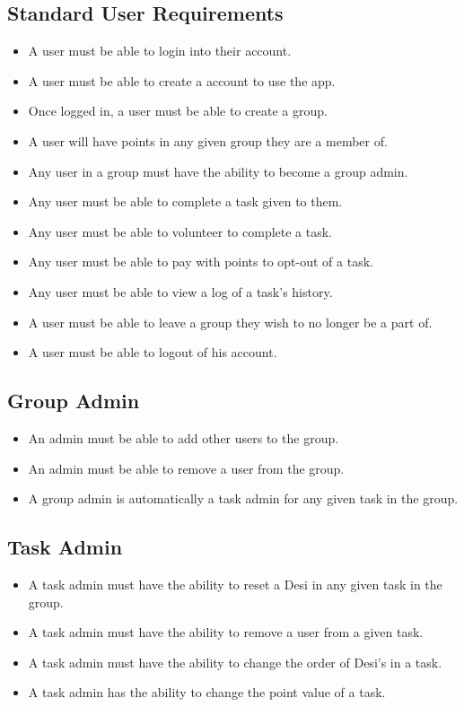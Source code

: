 \documentclass[11pt, a4paper]{report}
\begin{document}
\subsection{Standard User Requirements}
\begin{itemize} 
\item A user must be able to login into their account.
\item A user must be able to create a account to use the app.
\item Once logged in, a user must be able to create a group.
\item A user will have points in any given group they are a member of.
\item Any user in a group must have the ability to become a group admin.
\item Any user must be able to complete a task given to them.
\item Any user must be able to volunteer to complete a task.
\item Any user must be able to pay with points to opt-out of a task.
\item Any user must be able to view a log of a task's history.
\item A user must be able to leave a group they wish to no longer be a part of.
\item A user must be able to logout of his account.
 \end{itemize}


\subsection{Group Admin}
\begin{itemize}
\item An admin must be able to add other users to the group.
\item An admin must be able to remove a user from the group.
\item A group admin is automatically a task admin for any given task in the group.
\end{itemize}


\subsection{Task Admin}
\begin{itemize}
\item A task admin must have the ability to reset a Desi in any given task in the group.
\item A task admin must have the ability to remove a user from a given task.
\item A task admin must have the ability to change the order of Desi's in a task.
\item A task admin has the ability to change the point value of a task.
\end{itemize}
\end{document}
